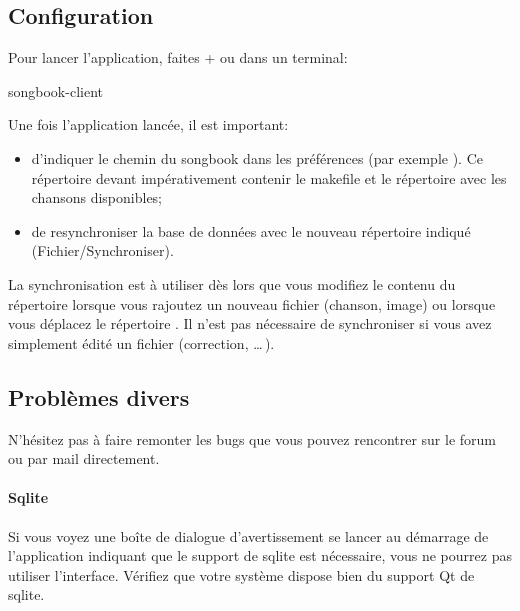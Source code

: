\documentclass[versionenligne]{patacrep}
\newcommand{\Touche}[1]{\Ovalbox{#1}}
\begin{document}
\subsection{Configuration}

Pour lancer l'application,
faites \Touche{Alt}+\Touche{F2}  ou dans un
terminal:
\begin{unixcom}
  songbook-client
\end{unixcom}

Une fois l'application lancée, il est important:
\begin{itemize}
\item d'indiquer le chemin du songbook dans les préférences (par
  exemple ). Ce répertoire devant impérativement
  contenir le makefile et le répertoire  avec les chansons
  disponibles;
\item de resynchroniser la base de données avec le nouveau répertoire
  indiqué (Fichier/Synchroniser).
\end{itemize}

\begin{nota}
  La synchronisation est à utiliser dès lors que vous modifiez le
  contenu du répertoire  lorsque vous rajoutez un nouveau
  fichier (chanson, image) ou lorsque vous déplacez le répertoire
  .  Il n'est pas nécessaire de synchroniser si vous
  avez simplement édité un fichier (correction, \dots\,).
\end{nota}

\subsection{Problèmes divers}

N'hésitez pas à faire remonter les bugs que vous pouvez rencontrer sur
le forum ou par mail directement.

\paragraph{Sqlite} 
Si vous voyez une boîte de dialogue d'avertissement se lancer au
démarrage de l'application indiquant que le support de sqlite est
nécessaire, vous ne pourrez pas utiliser l'interface. Vérifiez que
votre système dispose bien du support Qt de sqlite.
\end{document}
